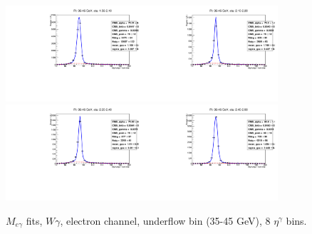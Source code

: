 \begin{figure}[htb]
\begin{center}
   \includegraphics[width=0.45\textwidth]{../figs/figs_v11/ELECTRON_WGamma/EtoGammaFits/sa_hZmass_h_Data_EtoGamma_Enr_ENDCAP_pt35to45_ieta0_noWMtCut.pdf}\includegraphics[width=0.45\textwidth]{../figs/figs_v11/ELECTRON_WGamma/EtoGammaFits/sa_hZmass_h_Data_EtoGamma_Enr_ENDCAP_pt35to45_ieta1_noWMtCut.pdf}\\
   \includegraphics[width=0.45\textwidth]{../figs/figs_v11/ELECTRON_WGamma/EtoGammaFits/sa_hZmass_h_Data_EtoGamma_Enr_ENDCAP_pt35to45_ieta2_noWMtCut.pdf}\includegraphics[width=0.45\textwidth]{../figs/figs_v11/ELECTRON_WGamma/EtoGammaFits/sa_hZmass_h_Data_EtoGamma_Enr_ENDCAP_pt35to45_ieta3_noWMtCut.pdf}\\
  \label{fig:etogFits_35to45}
  \caption{$M_{e\gamma}$ fits, $W\gamma$, electron channel, underflow bin (35-45 GeV), 8 $\eta^{\gamma}$ bins.}
  \end{center}
\end{figure}

